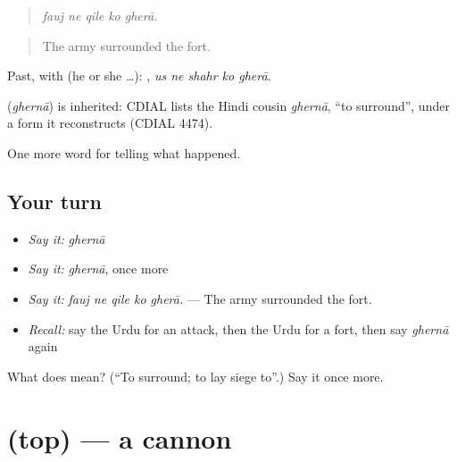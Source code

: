 \begin{quote}
    
\end{quote}

\begin{quote}
\emph{fauj ne qile ko gherā.}
\end{quote}

\begin{quote}
The army surrounded the fort.
\end{quote}

Past, with  (he or she …):     , \emph{us ne shahr ko gherā}.

\begin{cousinweb}
\textbf{} (\emph{ghernā}) is inherited: CDIAL lists the Hindi cousin \emph{ghernā}, \textquotedblleft{}to surround\textquotedblright{}, under a form it reconstructs (CDIAL 4474).
\end{cousinweb}

\begin{grammarlens}[title={What you've built}]
One more word for telling what happened.
\end{grammarlens}

\subsection*{Your turn}
\begin{itemize}
\raggedright
  \item \emph{Say it:} \emph{ghernā}
  \item \emph{Say it:} \emph{ghernā}, once more
  \item \emph{Say it:} \emph{fauj ne qile ko gherā.} — The army surrounded the fort.
  \item \emph{Recall:} say the Urdu for an attack, then the Urdu for a fort, then say \emph{ghernā} again
\end{itemize}

\begin{tcolorbox}[breakable,colback=teal!4,colframe=teal!35!black,title={Before you move on}]
What does  mean? (\textquotedblleft{}To surround; to lay siege to\textquotedblright{}.) Say it once more.
\end{tcolorbox}
\section[\texorpdfstring{\ur{توپ} (top)}{توپ (top)}]{ (top) — a cannon}

